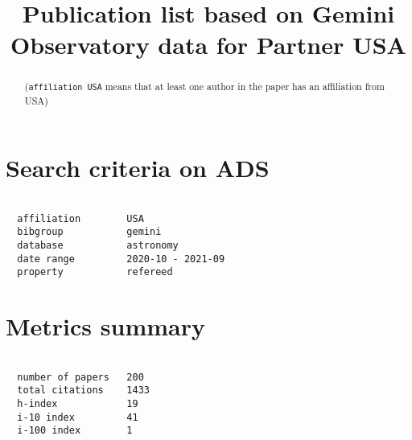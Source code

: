 \documentclass[twocolumn,linenumbers]{aastex631}
\begin{document}
\title{Publication list based on Gemini Observatory data for Partner USA}

\begin{abstract}

(\texttt{affiliation USA} means that at least one author in the paper has an affiliation from USA)

\end{abstract}

\section*{Search criteria on ADS}

\begin{verbatim}

  affiliation        USA
  bibgroup           gemini
  database           astronomy
  date range         2020-10 - 2021-09
  property           refereed

\end{verbatim}

\vspace{3.0cm}

\section*{Metrics summary}

\begin{verbatim}

  number of papers   200
  total citations    1433
  h-index            19
  i-10 index         41
  i-100 index        1

\end{verbatim}

\nocite{*}


\end{document}
